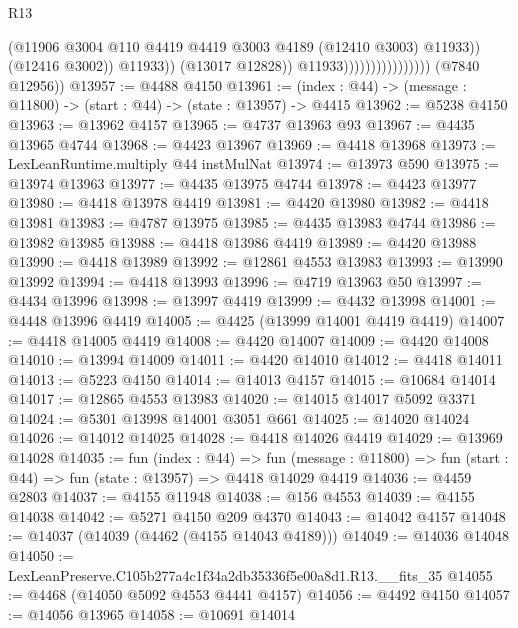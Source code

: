 \begin{lexlean}{R13}
\begin{coremodule}
                                                (@11906
                                                  @3004
                                                  @110
                                                  @4419
                                                  @4419
                                                  @3003
                                                  @4189
                                                  (@12410 @3003)
                                                  @11933))
                                              (@12416 @3002))
                                            @11933))
                                        (@13017 @12828))
                                      @11933))))))))))))))))
      (@7840 @12956))
@13957 := @4488 @4150
@13961 := (index : @44) -> (message : @11800) -> (start : @44) -> (state : @13957) -> @4415
@13962 := @5238 @4150
@13963 := @13962 @4157
@13965 := @4737 @13963 @93
@13967 := @4435 @13965 @4744
@13968 := @4423 @13967
@13969 := @4418 @13968
@13973 := LexLeanRuntime.multiply @44 instMulNat
@13974 := @13973 @590
@13975 := @13974 @13963
@13977 := @4435 @13975 @4744
@13978 := @4423 @13977
@13980 := @4418 @13978 @4419
@13981 := @4420 @13980
@13982 := @4418 @13981
@13983 := @4787 @13975
@13985 := @4435 @13983 @4744
@13986 := @13982 @13985
@13988 := @4418 @13986 @4419
@13989 := @4420 @13988
@13990 := @4418 @13989
@13992 := @12861 @4553 @13983
@13993 := @13990 @13992
@13994 := @4418 @13993
@13996 := @4719 @13963 @50
@13997 := @4434 @13996
@13998 := @13997 @4419
@13999 := @4432 @13998
@14001 := @4448 @13996 @4419
@14005 := @4425 (@13999 @14001 @4419 @4419)
@14007 := @4418 @14005 @4419
@14008 := @4420 @14007
@14009 := @4420 @14008
@14010 := @13994 @14009
@14011 := @4420 @14010
@14012 := @4418 @14011
@14013 := @5223 @4150
@14014 := @14013 @4157
@14015 := @10684 @14014
@14017 := @12865 @4553 @13983
@14020 := @14015 @14017 @5092 @3371
@14024 := @5301 @13998 @14001 @3051 @661
@14025 := @14020 @14024
@14026 := @14012 @14025
@14028 := @4418 @14026 @4419
@14029 := @13969 @14028
@14035 := fun (index : @44) =>
  fun (message : @11800) => fun (start : @44) => fun (state : @13957) => @4418 @14029 @4419
@14036 := @4459 @2803
@14037 := @4155 @11948
@14038 := @156 @4553
@14039 := @4155 @14038
@14042 := @5271 @4150 @209 @4370
@14043 := @14042 @4157
@14048 := @14037 (@14039 (@4462 (@4155 @14043 @4189)))
@14049 := @14036 @14048
@14050 := LexLeanPreserve.C105b277a4c1f34a2db35336f5e00a8d1.R13.__fits_35
@14055 := @4468 (@14050 @5092 @4553 @4441 @4157)
@14056 := @4492 @4150
@14057 := @14056 @13965
@14058 := @10691 @14014

\end{coremodule}
\end{lexlean}
